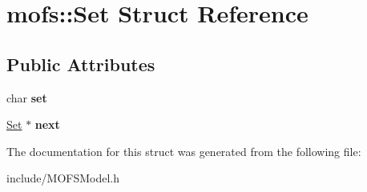 \hypertarget{structmofs_1_1Set}{\section{mofs\-:\-:Set Struct Reference}
\label{structmofs_1_1Set}
}
\subsection*{Public Attributes}
\begin{DoxyCompactItemize}
\item 
\hypertarget{structmofs_1_1Set_aff4f4bf9beec48c24dc00f14618f9e59}{char {\bfseries set}}\label{structmofs_1_1Set_aff4f4bf9beec48c24dc00f14618f9e59}

\item 
\hypertarget{structmofs_1_1Set_a972a6aab86cccb285acbae6900b74f77}{\hyperlink{structmofs_1_1Set}{Set} $\ast$ {\bfseries next}}\label{structmofs_1_1Set_a972a6aab86cccb285acbae6900b74f77}

\end{DoxyCompactItemize}


The documentation for this struct was generated from the following file\-:\begin{DoxyCompactItemize}
\item 
include/M\-O\-F\-S\-Model.\-h\end{DoxyCompactItemize}
